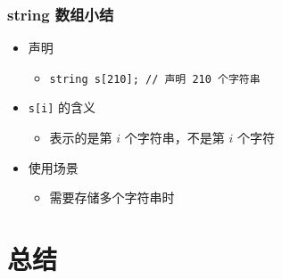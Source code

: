 \begin{frame}[fragile]
    \frametitle{string 数组小结}

    \begin{itemize}
        \item 声明
        
        \begin{itemize}
            \item<2-> \lstinline|string s[210]; // 声明 210 个字符串|
        \end{itemize}

        \item \lstinline|s[i]| 的含义
        
        \begin{itemize}
            \item<3-> 表示的是第 $i$ 个字符串，不是第 $i$ 个字符
        \end{itemize}

        \item 使用场景
        
        \begin{itemize}
            \item<4-> 需要存储多个字符串时
        \end{itemize}

    \end{itemize}
            
\end{frame}


\section{总结}

